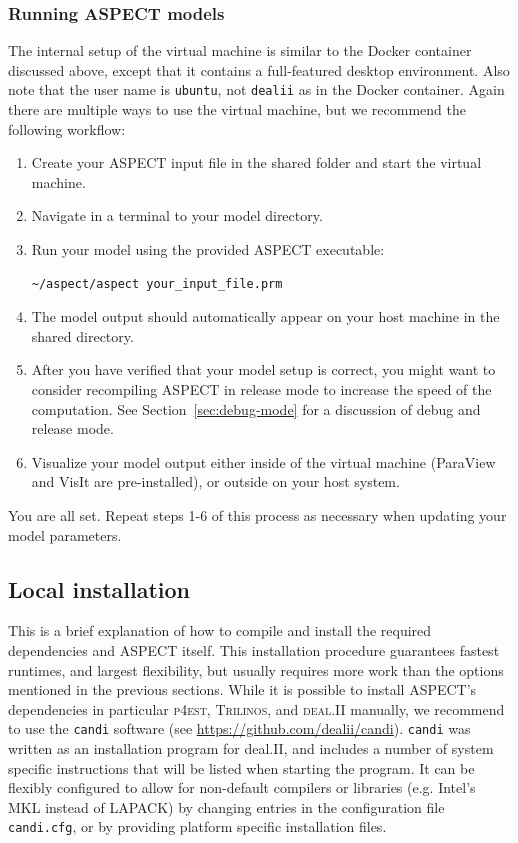 \documentclass{article}
\newcommand{\dealii}{{\textsc{deal.II}}}
\newcommand{\pfrst}{{\normalfont\textsc{p4est}}}
\newcommand{\trilinos}{{\textsc{Trilinos}}}
\newcommand{\aspect}{\textsc{ASPECT}}
\begin{document}
\subsubsection{Running \aspect{} models}

The internal setup of the virtual machine is similar to the Docker container
discussed above, except that it contains a full-featured desktop environment.
Also note that the user name is \texttt{ubuntu}, not \texttt{dealii} as in the
Docker container. Again there are multiple ways to use the virtual machine, but
we recommend the following workflow:

\begin{enumerate}
\item Create your \aspect{} input file in the shared folder and start the
virtual machine.
\item Navigate in a terminal to your model directory.
\item Run your model using the provided \aspect{} executable:

\begin{lstlisting}[frame=single,language=ksh]
~/aspect/aspect your_input_file.prm
\end{lstlisting}

\item The model output should automatically appear on your host machine in the
shared directory.

\item After you have verified that your model setup is correct, you might want
to consider recompiling \aspect{} in release mode to increase the speed of the
computation. See Section~\ref{sec:debug-mode} for a discussion of debug and
release mode.

\item Visualize your model output either inside of the virtual machine
(ParaView and VisIt are pre-installed), or outside on your host system.
\end{enumerate}

You are all set. Repeat steps 1-6 of this process as necessary when updating
your model parameters. 

\subsection{Local installation}

This is a brief explanation of how to compile and install the required dependencies and
\aspect{} itself. This installation procedure guarantees fastest runtimes, and largest flexibility,
but usually requires more work than the options mentioned in the previous sections. 
While it is possible to install ASPECT's dependencies in particular \pfrst{}, \trilinos{}, 
and \dealii{} manually, we recommend to use the 
\texttt{candi} software (see \url{https://github.com/dealii/candi}). \texttt{candi} was written
as an installation program for deal.II, and includes a number of system specific instructions
that will be listed when starting the program. It can be flexibly configured to allow for
non-default compilers or libraries (e.g. Intel's MKL instead of LAPACK) by changing entries
in the configuration file \texttt{candi.cfg}, or by providing platform specific installation files.
\end{document}
